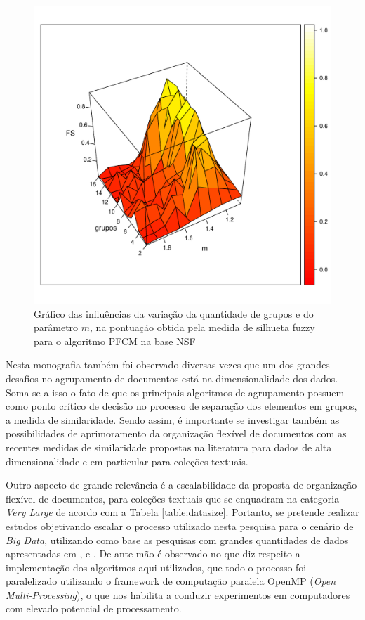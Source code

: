 \begin{figure}[!h] \centering 
  \centering
  \includegraphics[width=0.8\columnwidth]{assets/future_works/pfcm_nsf_varying.pdf} 
  \caption{Gráfico das influências da variação da quantidade de grupos e do parâmetro $m$, na
pontuação obtida pela medida de silhueta fuzzy para o algoritmo PFCM na base NSF} 
  \label{fig:pfcmvarying}
\end{figure}

Nesta monografia também foi observado diversas vezes que um dos grandes desafios no agrupamento de
documentos está na dimensionalidade dos dados. Soma-se a isso o fato de que os principais algoritmos
de agrupamento possuem como ponto crítico de decisão no processo de separação dos elementos em
grupos, a medida de similaridade. Sendo assim, é importante se investigar também as possibilidades de
aprimoramento da organização flexível de documentos com as recentes medidas de similaridade
propostas na literatura \cite{Lin2014,Nagwani2015} para dados de alta dimensionalidade e em
particular para coleções textuais.

Outro aspecto de grande relevância é a escalabilidade da proposta de organização flexível de
documentos, para coleções textuais que se enquadram na categoria {\it Very Large\/} de acordo com a
Tabela \ref{table:datasize}. Portanto, se pretende realizar estudos objetivando escalar o processo
utilizado nesta pesquisa para o cenário de {\it Big Data\/}, utilizando como base as pesquisas com
grandes quantidades de dados apresentadas em ,  e
. De ante mão é observado no que diz respeito a implementação dos algoritmos
aqui utilizados, que todo o processo foi paralelizado utilizando o framework de computação paralela
OpenMP ({\it Open Multi-Processing\/})\footnotemark, o que nos habilita a conduzir experimentos em
computadores com elevado potencial de processamento.

